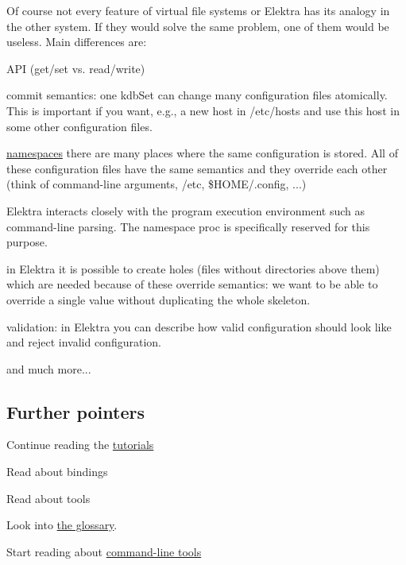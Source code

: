 Of course not every feature of virtual file systems or Elektra has its analogy in the other system. If they would solve the same problem, one of them would be useless. Main differences are\+:


\begin{DoxyItemize}
\item A\+P\+I (get/set vs. read/write)
\item commit semantics\+: one {\ttfamily kdb\+Set} can change many configuration files atomically. This is important if you want, e.\+g., a new host in {\ttfamily /etc/hosts} and use this host in some other configuration files.
\item \hyperlink{md_doc_help_elektra-namespaces_doc_help_elektra-namespaces_md}{namespaces} there are many places where the same configuration is stored. All of these configuration files have the same semantics and they override each other (think of command-\/line arguments, {\ttfamily /etc}, {\ttfamily \$\+H\+O\+M\+E/.config}, ...)
\item Elektra interacts closely with the program execution environment such as command-\/line parsing. The namespace {\ttfamily proc} is specifically reserved for this purpose.
\item in Elektra it is possible to create holes (files without directories above them) which are needed because of these override semantics\+: we want to be able to override a single value without duplicating the whole skeleton.
\item validation\+: in Elektra you can describe how valid configuration should look like and reject invalid configuration.
\item and much more...
\end{DoxyItemize}

\subsection*{Further pointers}


\begin{DoxyItemize}
\item Continue reading the \hyperlink{md_doc_tutorials_README_doc_tutorials_README_md}{tutorials}
\item Read about bindings
\item Read about tools
\item Look into \hyperlink{md_doc_help_elektra-glossary_doc_help_elektra-glossary_md}{the glossary}.
\item Start reading about \hyperlink{md_doc_help_kdb-introduction_doc_help_kdb-introduction_md}{command-\/line tools} 
\end{DoxyItemize}